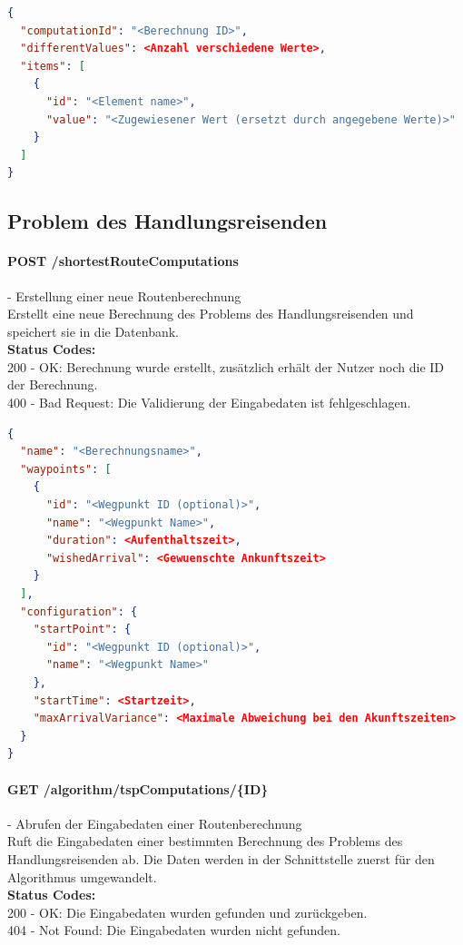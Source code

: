 \begin{lstlisting}[language=JSON, caption=Beispiel eines Endresultates für das Knotenfärbungsproblems, label=lst:solution_graphcoloring]  
{
  "computationId": "<Berechnung ID>",
  "differentValues": <Anzahl verschiedene Werte>,
  "items": [
    {
      "id": "<Element name>",
      "value": "<Zugewiesener Wert (ersetzt durch angegebene Werte)>"
    }
  ]
}
\end{lstlisting}

%
%
%
%

\subsection{Problem des Handlungsreisenden}

\paragraph{POST /shortestRouteComputations} - Erstellung einer neue Routenberechnung\mbox{}\\
Erstellt eine neue Berechnung des Problems des Handlungsreisenden und speichert sie in die Datenbank.\\
\textbf{Status Codes:}\\
200 - OK: Berechnung wurde erstellt, zusätzlich erhält der Nutzer noch die ID der Berechnung.\\
400 - Bad Request: Die Validierung der Eingabedaten ist fehlgeschlagen.\\

\begin{lstlisting}[language=JSON, caption=Beispiel einer Eingabe für das Problem des Handlungsreisenden, label=lst:input_tsp]  
{
  "name": "<Berechnungsname>",
  "waypoints": [
    {
      "id": "<Wegpunkt ID (optional)>",
      "name": "<Wegpunkt Name>",
      "duration": <Aufenthaltszeit>,
      "wishedArrival": <Gewuenschte Ankunftszeit>
    }
  ],
  "configuration": {
    "startPoint": {
      "id": "<Wegpunkt ID (optional)>",
      "name": "<Wegpunkt Name>"
    },
    "startTime": <Startzeit>,
    "maxArrivalVariance": <Maximale Abweichung bei den Akunftszeiten>
  }
}
\end{lstlisting}

\paragraph{GET /algorithm/tspComputations/\{ID\}} - Abrufen der Eingabedaten einer Routenberechnung\mbox{}\\
Ruft die Eingabedaten einer bestimmten Berechnung des Problems des Handlungsreisenden ab. Die Daten werden in der Schnittstelle zuerst für den Algorithmus umgewandelt.\\
\textbf{Status Codes:}\\
200 - OK: Die Eingabedaten wurden gefunden und zurückgeben.\\
404 - Not Found: Die Eingabedaten wurden nicht gefunden.\\

